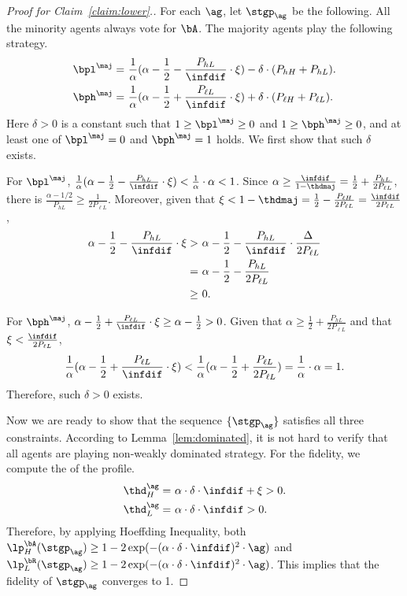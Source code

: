 \begin{proof}[Proof for Claim~\ref{claim:lower}.]
    For each $\ag$, let $\stgp_\ag$ be the following. All the minority agents always vote for $\bA$. The majority agents play the following strategy.
    \begin{align*}
        \bpl^{\maj}  =&\ \frac1{\alpha} (\alpha - \frac12 - \frac{P_{hL}}{\infdif}\cdot \xi) - \delta \cdot (P_{h H} + P_{h L}).\\
        \bph^{\maj}  =&\ \frac1{\alpha} (\alpha - \frac12 + \frac{P_{\ell L}}{\infdif}\cdot \xi) +  \delta \cdot (P_{\ell H} + P_{\ell L}).
    \end{align*}
    Here $\delta > 0$ is a constant such that $1 \ge \bpl^{\maj} \ge 0$ and $1 \ge \bph^{\maj} \ge 0$, and at least one of $\bpl^{\maj} = 0$ and $\bph^{\maj} = 1$ holds. We first show that such $\delta$ exists. 

    For $\bpl^{\maj}$, $\frac1{\alpha} (\alpha - \frac12 - \frac{P_{hL}}{\infdif}\cdot \xi) <\frac1{\alpha} \cdot \alpha < 1$. 
    Since $\alpha \ge \frac{\infdif}{1 - \thdmaj} = \frac{1}{2} + \frac{P_{hL}}{2P_{\ell L}}$,  there is $\frac{\alpha - 1/2}{P_{hL}} \ge \frac{1}{2P_{\ell L}}$. 
    Moreover, given that $\xi < 1- \thdmaj = \frac12 - \frac{P_{\ell H}}{2P_{\ell L}} = \frac{\infdif}{2P_{\ell L}}$, 
    \begin{align*}
        \alpha - \frac12 - \frac{P_{hL}}{\infdif}\cdot \xi >&\ \alpha - \frac12 - \frac{P_{hL}}{\infdif}\cdot  \frac{\Delta}{2P_{\ell L}}\\
        =&\ \alpha - \frac12-  \frac{P_{hL}}{2P_{\ell L}}\\
        \ge&\ 0. 
    \end{align*}

    For $\bph^{\maj}$, $\alpha - \frac12 + \frac{P_{\ell L}}{\infdif}\cdot \xi \ge \alpha - \frac12 > 0$. Given that $\alpha \ge \frac{1}{2} + \frac{P_{hL}}{2P_{\ell L}}$ and that $\xi < \frac{\infdif}{2P_{\ell L}}$, 
    \begin{align*}
        \frac1{\alpha} (\alpha - \frac12 + \frac{P_{\ell L}}{\infdif}\cdot \xi) < \frac{1}{\alpha}(\alpha - \frac12 +  \frac{P_{\ell L}}{2P_{\ell L}}) = \frac{1}{\alpha}\cdot \alpha = 1.
    \end{align*}
    Therefore, such $\delta  > 0$ exists. 

    Now we are ready to show that the sequence $\{\stgp_\ag\}$ satisfies all three constraints. According to Lemma~\ref{lem:dominated}, it is not hard to verify that all agents are playing non-weakly dominated strategy. For the fidelity, we compute the \exshare{} of the profile. 
    \begin{align*}
        \thd_H^\ag = &\ \alpha \cdot \delta \cdot \infdif + \xi > 0.\\
        \thd_L^\ag = &\ \alpha \cdot \delta \cdot \infdif > 0. 
    \end{align*}
    Therefore, by applying Hoeffding Inequality, both $\lp_H^{\bA}(\stgp_\ag) \ge 1 - 2\exp(-(\alpha \cdot \delta \cdot \infdif)^2 \cdot \ag)$ and $\lp_L^{\bR}(\stgp_\ag) \ge 1 - 2\exp(-(\alpha \cdot \delta \cdot \infdif)^2 \cdot \ag)$. This implies that the fidelity of $\stgp_\ag$ converges to 1. 


\end{proof}
